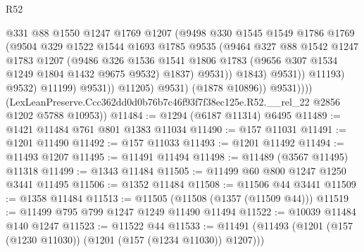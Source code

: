 \begin{lexlean}{R52}
\begin{coremodule}
                                  @331
                                  @88
                                  @1550
                                  @1247
                                  @1769
                                  @1207
                                  (@9498
                                    @330
                                    @1545
                                    @1549
                                    @1786
                                    @1769
                                    (@9504
                                      @329
                                      @1522
                                      @1544
                                      @1693
                                      @1785
                                      @9535
                                      (@9464
                                        @327
                                        @88
                                        @1542
                                        @1247
                                        @1783
                                        @1207
                                        (@9486
                                          @326
                                          @1536
                                          @1541
                                          @1806
                                          @1783
                                          (@9656 @307 @1534 @1249 @1804 @1432 @9675 @9532)
                                          @1837)
                                        @9531))
                                    @1843)
                                  @9531))
                              @11193)
                            @9532)
                          @11199)
                        @9531))
                    @11205)
                  @9531)
                (@1878 @10896))
              @9531))))
      (LexLeanPreserve.Ccc362dd0d0b76b7c46f93f7f38ec125e.R52.__rel_22 @2856 @1202 @5788 @10953))
@11484 := @1294 (@6187 @11314) @6495
@11489 := @1421 @11484 @761 @801 @1383 @11034
@11490 := @157 @11031
@11491 := @1201 @11490
@11492 := @157 @11033
@11493 := @1201 @11492
@11494 := @11493 @1207
@11495 := @11491 @11494
@11498 := @11489 (@3567 @11495) @11318
@11499 := @1343 @11484
@11505 := @11499 @60 @800 @1247 @1250 @3441 @11495
@11506 := @1352 @11484
@11508 := @11506 @44 @3441
@11509 := @1358 @11484
@11513 := @11505 (@11508 (@1357 (@11509 @44)))
@11519 := @11499 @795 @799 @1247 @1249 @11490 @11494
@11522 := @10039 @11484 @140 @1247
@11523 := @11522 @44
@11533 := @11491 (@11493 (@1201 (@157 (@1230 @11030)) (@1201 (@157 (@1234 @11030)) @1207)))

\end{coremodule}
\end{lexlean}
